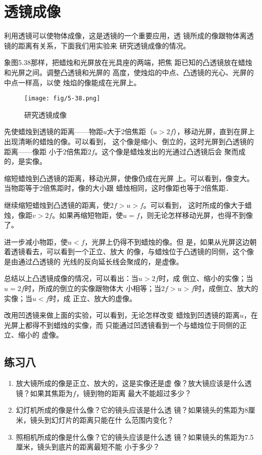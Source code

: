  \section{透镜成像}
    利用透镜可以使物体成像，这是透镜的一个重要应用，透
    镜所成的像跟物体离透镜的距离有关系，下面我们用实验来
    研究透镜成像的情况。

    象图5.38那样，把蜡烛和光屏放在光具座的两端，把焦
    距已知的凸透镜放在蜡烛和光屏之间。调整凸透镜和光屏的
    高度，使烛焰的中点、凸透镜的光心、光屏的中点一样高，以使
    烛焰的像能成在光屏上。
    \begin{figure}[htp]\centering
        \texttt{[image: fig/5-38.png]}
        \caption{研究透镜成像}
        \end{figure}

    先使蜡烛到透镜的距离——物距$u$大于2倍焦距（$u>
    2f$），移动光屏，直到在屏上出现清晰的蜡烛的像。可以看到，
    这个像是缩小、倒立的，这时光屏到凸透镜的距离——像距
    小于2倍焦距$2f$。这个像是蜡烛发出的光通过凸透镜后会
    聚而成的，是实像。

    缩短蜡烛到凸透镜的距离，移动光屏，使像仍成在光屏
    上。可以看到，像变大。当物距等于2倍焦距时，像的大小跟
    蜡烛相同，这时像距也等于2倍焦距．

    继续缩短蜡烛到凸透镜的距离，使$2f>u>f$。可以看到，
    这时所成的像大于蜡烛，像距$v>2f$。如果再缩短物距，使$u=
    f$，则无论怎样移动光屏，也得不到像了。

    进一步减小物距，使$u<f$，光屏上仍得不到蜡烛的像。但
    是，如果从光屏这边朝着透镜看去，可以看到一个正立、放大
    的像，与蜡烛位于凸透镜的同侧，这个像是由通过凸透镜的
    光线的反向延长线会聚成的，是虚像。

    总结以上凸透镜成像的情况，可以看出：当$u>2f$时，成
    倒立、缩小的实像；当$u=2f$时，所成的倒立的实像跟物体大
    小相等；当$2f>u>f$时，成倒立、放大的实像；当$u<f$时，成
    正立、放大的虚像。

    改用凹透镜来做上面的实验，可以看到，无论怎样改变
    蜡烛到凹透镜的距离$u$，在光屏上都得不到蜡烛的实像，而
    只能通过凹透镜看到一个与蜡烛位于同侧的正立、缩小的
    虚像。

    \subsection*{练习八}
    \begin{enumerate}
        \item 放大镜所成的像是正立、放大的，这是实像还是虚
    像？放大镜应该是什么透镜？如果其焦距为$f$，镜到物的距离
    最大不能超过多少？
    \item 幻灯机所成的像是什么像？它的镜头应该是什么透
    镜？如果镜头的焦距为8厘米，镜头到幻灯片的距离只能在什
    么范围内变化？
    \item 照相机所成的像是什么像？它的镜头应该是什么透
    镜？如果镜头的焦距为7.5厘米，镜头到底片的距离最短不能
    小于多少？
    \end{enumerate}

